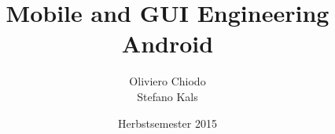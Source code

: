 \documentclass[a4paper,10pt]{extarticle}
\title{Mobile and GUI Engineering\\\large Android}
\author{Oliviero Chiodo\\ Stefano Kals}
\date{Herbstsemester 2015}
\affil{Hochschule für Technik Rapperswil}
\begin{document}
\raggedright
\footnotesize
\begin{multicols*}{3}

\setlength{\premulticols}{1pt}
\setlength{\postmulticols}{1pt}
\setlength{\multicolsep}{1pt}
\setlength{\columnsep}{2pt}






\end{multicols*}
\end{document}
